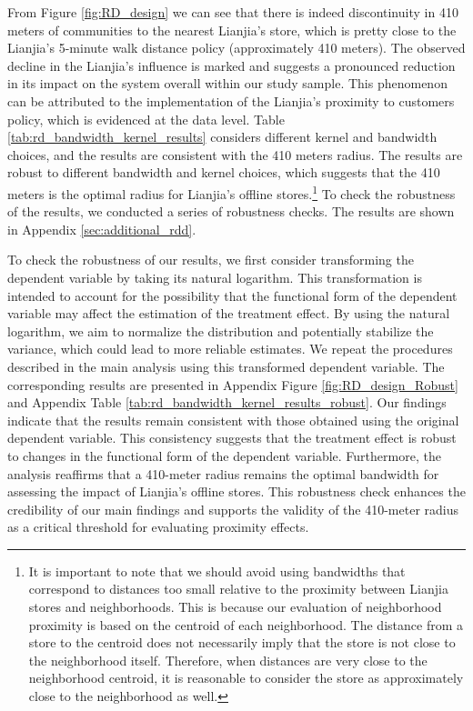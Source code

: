 \documentclass[11pt]{article}
\begin{document}
From Figure \ref{fig:RD_design} we can see that there is indeed discontinuity in 410 meters of communities to the nearest Lianjia's store, which is pretty close to the Lianjia's 5-minute walk distance policy (approximately 410 meters). The observed decline in the Lianjia's influence is marked and suggests a pronounced reduction in its impact on the system overall within our study sample. This phenomenon can be attributed to the implementation of the Lianjia's proximity to customers policy, which is evidenced at the data level. Table \ref{tab:rd_bandwidth_kernel_results} considers different kernel and bandwidth choices, and the results are consistent with the 410 meters radius. The results are robust to different bandwidth and kernel choices, which suggests that the 410 meters is the optimal radius for Lianjia's offline stores.\footnote{It is important to note that we should avoid using bandwidths that correspond to distances too small relative to the proximity between Lianjia stores and neighborhoods. This is because our evaluation of neighborhood proximity is based on the centroid of each neighborhood. The distance from a store to the centroid does not necessarily imply that the store is not close to the neighborhood itself. Therefore, when distances are very close to the neighborhood centroid, it is reasonable to consider the store as approximately close to the neighborhood as well.} To check the robustness of the results, we conducted a series of robustness checks. The results are shown in Appendix \ref{sec:additional_rdd}.

To check the robustness of our results, we first consider transforming the dependent variable by taking its natural logarithm. This transformation is intended to account for the possibility that the functional form of the dependent variable may affect the estimation of the treatment effect. By using the natural logarithm, we aim to normalize the distribution and potentially stabilize the variance, which could lead to more reliable estimates. We repeat the procedures described in the main analysis using this transformed dependent variable. The corresponding results are presented in Appendix Figure \ref{fig:RD_design_Robust} and Appendix Table \ref{tab:rd_bandwidth_kernel_results_robust}. Our findings indicate that the results remain consistent with those obtained using the original dependent variable. This consistency suggests that the treatment effect is robust to changes in the functional form of the dependent variable. Furthermore, the analysis reaffirms that a 410-meter radius remains the optimal bandwidth for assessing the impact of Lianjia's offline stores. This robustness check enhances the credibility of our main findings and supports the validity of the 410-meter radius as a critical threshold for evaluating proximity effects.
\end{document}
